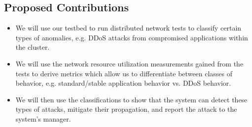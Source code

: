 \subsection{Proposed Contributions}
\begin{itemize}
	\item We will use our testbed to run distributed network tests to classify certain types of anomalies, e.g. DDoS attacks from compromised applications within the cluster.
	\item We will use the network resource utilization measurements gained from the tests to derive metrics which allow us to differentiate between classes of behavior, e.g. standard/stable application behavior vs. DDoS behavior.
	\item We will then use the classifications to show that the system can detect these types of attacks, mitigate their propagation, and report the attack to the system's manager.  
\end{itemize}
